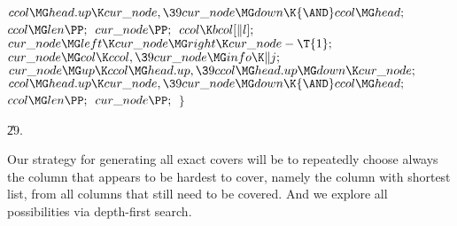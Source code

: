 ${}\\{ccol}\MG\\{head}.\\{up}\K\\{cur\_node},\39\\{cur\_node}\MG\\{down}\K{%
\AND}\\{ccol}\MG\\{head};{}$\6
${}\\{ccol}\MG\\{len}\PP;{}$\6
${}\\{cur\_node}\PP;{}$\6
${}\\{ccol}\K\\{bcol}[\|l];{}$\6
${}\\{cur\_node}\MG\\{left}\K\\{cur\_node}\MG\\{right}\K\\{cur\_node}-\T{1};{}$%
\6
${}\\{cur\_node}\MG\\{col}\K\\{ccol},\39\\{cur\_node}\MG\\{info}\K\|j;{}$\6
${}\\{cur\_node}\MG\\{up}\K\\{ccol}\MG\\{head}.\\{up},\39\\{ccol}\MG\\{head}.%
\\{up}\MG\\{down}\K\\{cur\_node};{}$\6
${}\\{ccol}\MG\\{head}.\\{up}\K\\{cur\_node},\39\\{cur\_node}\MG\\{down}\K{%
\AND}\\{ccol}\MG\\{head};{}$\6
${}\\{ccol}\MG\\{len}\PP;{}$\6
${}\\{cur\_node}\PP;{}$\6
\4${}\}{}$\2\par
\U29.\fi

Our strategy for generating all exact covers will be
to repeatedly
choose always the column that appears to be hardest to cover, namely the
column with shortest list, from all columns that still need to be covered.
And we explore all possibilities via depth-first search.

